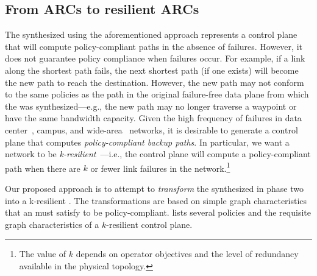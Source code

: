 \subsection{From ARCs to resilient ARCs} \label{sec:phase3}


The \ARC synthesized using the aforementioned approach represents a control
plane that will compute policy-compliant paths in the absence of failures.
However, it does not guarantee policy compliance when failures occur. For
example, if a link along the shortest path fails, the next shortest path (if
one exists) will become the new path to reach the destination. However, the
new path may not conform to the same policies as the path in the original
failure-free data plane from which the \ARC was synthesized---e.g., the new
path may no longer traverse a waypoint or have the same bandwidth capacity.
Given the high frequency of failures in data center~\cite{datacenterfailures},
campus, and wide-area~\cite{turner10:sigcomm} networks, it is desirable to
generate a control plane that computes {\em policy-compliant backup paths}.
In particular, we want a network to be {\em k-resilient}~\cite{plinko}---i.e.,
the control plane will compute a policy-compliant path when there are $k$ or
fewer link failures in the network.\footnote{The value of $k$ depends on
operator objectives and the level of redundancy available in the physical
topology.} 




Our proposed  approach is to attempt to {\em transform} the \ARC synthesized in phase
two into a k-resilient \ARC.
The transformations are based on simple graph characteristics that an \ARC
must satisfy to be policy-compliant.  
lists several policies and the requisite graph characteristics of a
$k$-resilient control plane. 

